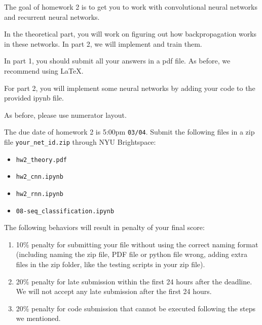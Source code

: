 The goal of homework 2 is to get you to work with convolutional neural networks and recurrent neural networks. 

In the theoretical part, you will work on figuring out how backpropagation works in these networks. In part 2, we will implement and train them.

In part 1, you should submit all your answers in a pdf file. As before, we recommend using \LaTeX. 

For part 2, you will implement some neural networks by adding your code to the provided ipynb file. 

As before, please use numerator layout.

The due date of homework 2 is 5:00pm \texttt{03/04}.
Submit the following files in a zip file \texttt{your\_net\_id.zip} through NYU Brightspace:
\begin{itemize}
\item \texttt{hw2\_theory.pdf}
\item \texttt{hw2\_cnn.ipynb}
\item \texttt{hw2\_rnn.ipynb}
\item \texttt{08-seq\_classification.ipynb}
\end{itemize}

The following behaviors will result in penalty of your final score:
\begin{enumerate}
\item 10\% penalty for submitting your file without using the correct naming format (including naming the zip file, PDF file or python file wrong, adding extra files in the zip folder, like the testing scripts in your zip file). 
\item 20\% penalty for late submission within the first 24 hours after the deadline. We will not accept any late submission after the first 24 hours.
\item 20\% penalty for code submission that cannot be executed following the steps we mentioned.
\end{enumerate}
